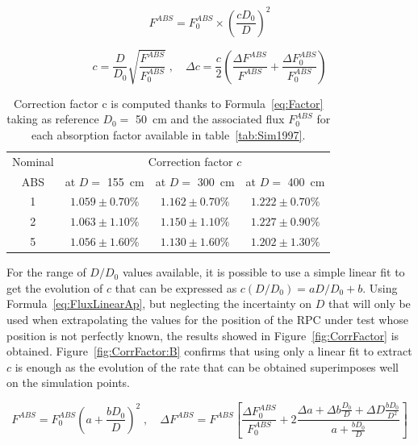 	\begin{equation}
	\label{eq:Flux}
	F^{ABS} = F_0^{ABS} \times \left( \frac{c D_0}{D} \right)^2
	\end{equation}
	
	\begin{equation}
	\label{eq:Factor}
	c = \frac{D}{D_0}\sqrt{\frac{F^{ABS}}{F_0^{ABS}}} \; , \quad \Delta c = \frac{c}{2}\left(\frac{\Delta F^{ABS}}{F^{ABS}}+\frac{\Delta F^{ABS}_0}{F^{ABS}_0}\right)
	\end{equation}
	
	\begin{table}[H]
		\centering
		\begin{tabular}{|*{4}{c|}}
			\hline
			Nominal & \multicolumn{3}{c|}{Correction factor $c$} \\
			ABS & at $D=$ \SI{155}{cm} & at $D=$ \SI{300}{cm} & at $D=$ \SI{400}{cm} \\
			\hline
			1 & $1.059 \pm 0.70\%$ & $1.162 \pm 0.70\%$ & $1.222 \pm 0.70\%$ \\
			\hline
			2 & $1.063 \pm 1.10\%$ & $1.150 \pm 1.10\%$ & $1.227 \pm 0.90\%$ \\
			\hline
			5 & $1.056 \pm 1.60\%$ & $1.130 \pm 1.60\%$ & $1.202 \pm 1.30\%$ \\
			\hline
		\end{tabular}
		\caption{\label{tab:CorrFactor} Correction factor c is computed thanks to Formula~\ref{eq:Factor} taking as reference $D_0 =$ \SI{50}{cm} and the associated flux $F_0^{ABS}$ for each absorption factor available in table~\ref{tab:Sim1997}.}
	\end{table}
	
	For the range of $D/D_0$ values available, it is possible to use a simple linear fit to get the evolution of $c$ that can be expressed as $c(D/D_0)=aD/D_0+b$. Using Formula~\ref{eq:FluxLinearAp}, but neglecting the incertainty on $D$ that will only be used when extrapolating the values for the position of the RPC under test whose position is not perfectly known, the results showed in Figure~\ref{fig:CorrFactor} is obtained. Figure~\ref{fig:CorrFactor:B} confirms that using only a linear fit to extract $c$ is enough as the evolution of the rate that can be obtained superimposes well on the simulation points.
	
	\begin{equation}
	\label{eq:FluxLinearAp}
	F^{ABS} = F^{ABS}_0 \left( a + \frac{bD_0}{D} \right)^2 \; , \quad \Delta F^{ABS} = F^{ABS} \left[\frac{\Delta F^{ABS}_0}{F^{ABS}_0} + 2\frac{\Delta a + \Delta b\frac{D_0}{D} + \Delta D\frac{bD_0}{D^2}}{a + \frac{bD_0}{D}}\right]
	\end{equation}
	
